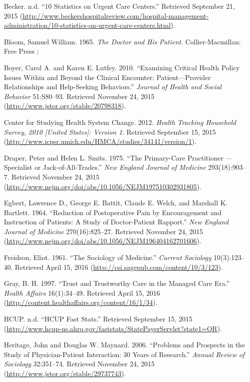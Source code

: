 \documentclass[12pt,twoside]{reedthesis}
\begin{document}
  Becker. n.d. ``10 Statistics on Urgent Care Centers.'' Retrieved
  September 21, 2015
  (\url{http://www.beckershospitalreview.com/hospital-management-administration/10-statistics-on-urgent-care-centers.html}).
  
  Bloom, Samuel William. 1965. \emph{The Doctor and His Patient.}
  Collier-Macmillan: Free Press ;
  
  Boyer, Carol A. and Karen E. Lutfey. 2010. ``Examining Critical Health
  Policy Issues Within and Beyond the Clinical Encounter:
  Patient---Provider Relationships and Help-Seeking Behaviors.''
  \emph{Journal of Health and Social Behavior} 51:S80--93. Retrieved
  November 24, 2015 (\url{http://www.jstor.org/stable/20798318}).
  
  Center for Studying Health System Change. 2012. \emph{Health Tracking
  Household Survey, 2010 {[}United States{]}: Version 1}. Retrieved
  September 15, 2015
  (\url{http://www.icpsr.umich.edu/HMCA/studies/34141/version/1}).
  
  Draper, Peter and Helen L. Smits. 1975. ``The Primary-Care Practitioner
  --- Specialist or Jack-of-All-Trades.'' \emph{New England Journal of
  Medicine} 293(18):903--7. Retrieved November 24, 2015
  (\url{http://www.nejm.org/doi/abs/10.1056/NEJM197510302931805}).
  
  Egbert, Lawrence D., George E. Battit, Claude E. Welch, and Marshall K.
  Bartlett. 1964. ``Reduction of Postoperative Pain by Encouragement and
  Instruction of Patients: A Study of Doctor-Patient Rapport.'' \emph{New
  England Journal of Medicine} 270(16):825--27. Retrieved November 24,
  2015 (\url{http://www.nejm.org/doi/abs/10.1056/NEJM196404162701606}).
  
  Freidson, Eliot. 1961. ``The Sociology of Medicine.'' \emph{Current
  Sociology} 10(3):123--40. Retrieved April 15, 2016
  (\url{http://csi.sagepub.com/content/10/3/123}).
  
  Gray, B. H. 1997. ``Trust and Trustworthy Care in the Managed Care
  Era.'' \emph{Health Affairs} 16(1):34--49. Retrieved April 15, 2016
  (\url{http://content.healthaffairs.org/content/16/1/34}).
  
  HCUP. n.d. ``HCUP Fast Stats.'' Retrieved September 15, 2015
  (\url{http://www.hcup-us.ahrq.gov/faststats/StatePayerServlet?state1=OR}).
  
  Heritage, John and Douglas W. Maynard. 2006. ``Problems and Prospects in
  the Study of Physician-Patient Interaction: 30 Years of Research.''
  \emph{Annual Review of Sociology} 32:351--74. Retrieved November 24,
  2015 (\url{http://www.jstor.org/stable/29737743}).
  
\end{document}
